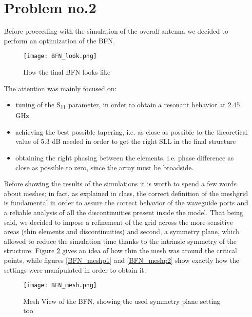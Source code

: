 \section{Problem no.2}

Before proceeding with the simulation of the overall antenna we decided to perform an optimization of the BFN.

\begin{figure}[H]
\centering
\texttt{[image: BFN\_look.png]}
\caption{How the final BFN looks like}
\label{BFN_look}
\end{figure}

\par\medskip
\noindent
The attention was mainly focused on:

\begin{itemize}
\item tuning of the S\textsubscript{11} parameter, in order to obtain a resonant behavior at 2.45 GHz
\item achieving the best possible tapering, i.e. as close as possible to the theoretical value of 5.3 dB needed in order to get the right SLL in the final structure
\item obtaining the right phasing between the elements, i.e. phase difference as close as possible to zero, since the array must be broadside.
\end{itemize}

\par\medskip
\noindent
Before showing the results of the simulations it is worth to spend a few words about meshes; in fact, as explained in class, the correct definition of the meshgrid is fundamental in order to assure the correct behavior of the waveguide ports and a reliable analysis of all the discontinuities present inside the model. That being said, we decided to impose a refinement of the grid across the more sensitive areas (thin elements and discontinuities) and second, a symmetry plane, which allowed to reduce the simulation time thanks to the intrinsic symmetry of the structure.
\noindent
Figure \ref{BFN_mesh} gives an idea of how thin the mesh was around the critical points, while figures \ref{BFN_meshp1} and \ref{BFN_meshp2} show exactly how the settings were manipulated in order to obtain it.

\begin{figure}[H]
\centering
\texttt{[image: BFN\_mesh.png]}
\caption{Mesh View of the BFN, showing the used symmetry plane setting too}
\label{BFN_mesh}
\end{figure}

